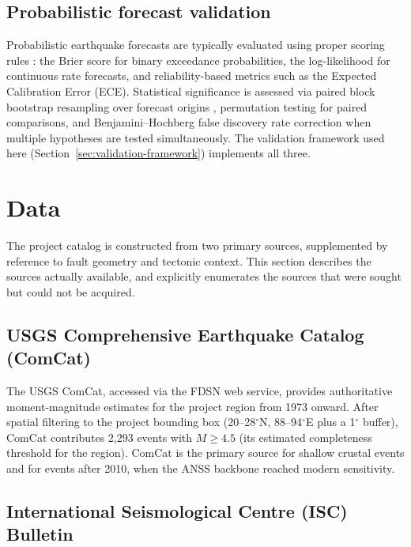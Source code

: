 \documentclass[10pt,a4paper,twocolumn]{article}
\begin{document}
\subsection{Probabilistic forecast validation}

Probabilistic earthquake forecasts are typically evaluated using proper scoring rules \cite{gershunin2005, marzocchi2012}: the Brier score for binary exceedance probabilities, the log-likelihood for continuous rate forecasts, and reliability-based metrics such as the Expected Calibration Error (ECE). Statistical significance is assessed via paired block bootstrap resampling over forecast origins \cite{politis1994}, permutation testing for paired comparisons, and Benjamini--Hochberg false discovery rate correction \cite{benjamini1995} when multiple hypotheses are tested simultaneously. The validation framework used here (Section~\ref{sec:validation-framework}) implements all three.

\section{Data}\label{sec:data}

The project catalog is constructed from two primary sources, supplemented by reference to fault geometry and tectonic context. This section describes the sources actually available, and explicitly enumerates the sources that were sought but could not be acquired.

\subsection{USGS Comprehensive Earthquake Catalog (ComCat)}

The USGS ComCat, accessed via the FDSN web service, provides authoritative moment-magnitude estimates for the project region from 1973 onward. After spatial filtering to the project bounding box (20--28$^\circ$N, 88--94$^\circ$E plus a 1$^\circ$ buffer), ComCat contributes 2{,}293 events with $M\geq4.5$ (its estimated completeness threshold for the region). ComCat is the primary source for shallow crustal events and for events after 2010, when the ANSS backbone reached modern sensitivity.

\subsection{International Seismological Centre (ISC) Bulletin}
\end{document}
